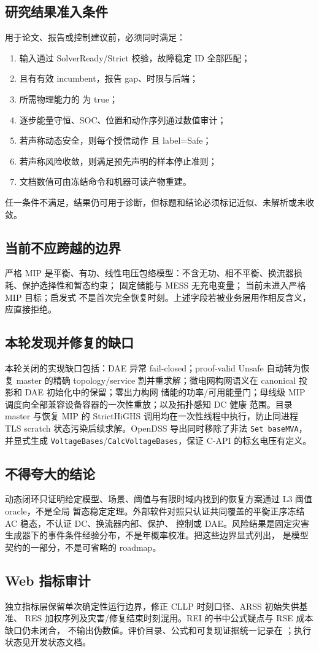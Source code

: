\subsection{研究结果准入条件}
用于论文、报告或控制建议前，必须同时满足：
\begin{enumerate}
 \item 输入通过 SolverReady/Strict 校验，故障稳定 ID 全部匹配；
 \item {} 且有有效 incumbent，报告 gap、时限与后端；
 \item 所需物理能力的  为 true；
 \item 逐步能量守恒、SOC、位置和动作序列通过数值审计；
 \item 若声称动态安全，则每个授信动作  且 label=Safe；
 \item 若声称风险收敛，则满足预先声明的样本停止准则；
 \item 文档数值可由冻结命令和机器可读产物重建。
\end{enumerate}
任一条件不满足，结果仍可用于诊断，但标题和结论必须标记近似、未解析或未收敛。

\subsection{当前不应跨越的边界}
严格 MIP 是平衡、有功、线性电压包络模型：不含无功、相不平衡、换流器损耗、保护选择性和暂态约束；
固定储能与 MESS 无充电变量； 当前未进入严格 MIP 目标；启发式
 不是首次完全恢复时刻。上述字段若被业务层用作相反含义，应直接拒绝。

\subsection{本轮发现并修复的缺口}
本轮关闭的实现缺口包括：DAE 异常 fail-closed；proof-valid Unsafe 自动转为恢复 master 的精确
topology/service 割并重求解；微电网构网语义在 canonical 投影和 DAE 初始化中的保留；零出力构网
储能的功率/可用能量门；母线级 MIP 调度向全部兼容设备容器的一次性重放；以及拓扑感知 DC 健康
范围。目录 master 与恢复 MIP 的 StrictHiGHS 调用均在一次性线程中执行，防止同进程 TLS scratch
状态污染后续求解。OpenDSS 导出同时移除了非法 \texttt{Set baseMVA}，并显式生成
\texttt{VoltageBases}/\texttt{CalcVoltageBases}，保证 C-API 的标幺电压有定义。

\subsection{不得夸大的结论}
动态闭环只证明给定模型、场景、阈值与有限时域内找到的恢复方案通过 L3 阈值 oracle，不是全局
暂态稳定定理。外部软件对照只认证共同覆盖的平衡正序冻结 AC 稳态，不认证 DC、换流器内部、保护、
控制或 DAE。风险结果是固定灾害生成器下的事件条件经验分布，不是年概率校准。把这些边界显式列出，
是模型契约的一部分，不是可省略的 roadmap。

\subsection{Web 指标审计}
独立指标层保留单次确定性运行边界，修正 CLLP 时刻口径、ARSS 初始失供基准、
RES 加权序列及灾害/修复结束时刻混用。REI 的书中公式疑点与 RSE 成本缺口仍未闭合，
不输出伪数值。评价目录、公式和可复现证据统一记录在
；执行状态见开发状态文档。
